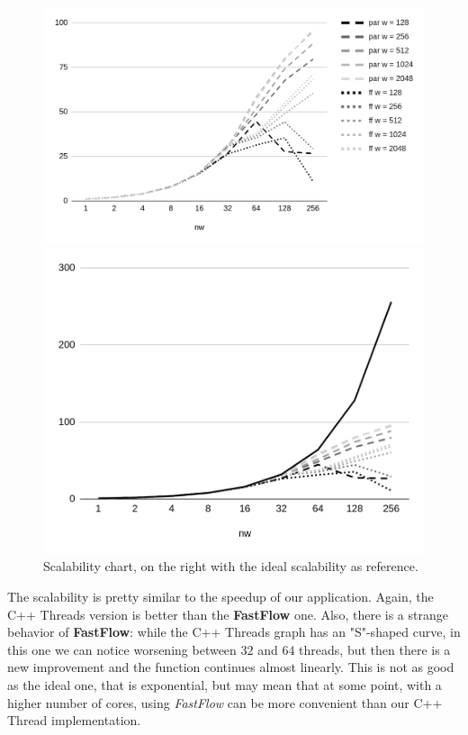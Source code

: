 \begin{figure}[H]
    \centering
    \begin{minipage}{.68\linewidth}
        \includegraphics[width=\linewidth]{assets/scalability}
    \end{minipage}
    \begin{minipage}{.3\linewidth}
        \includegraphics[width=\linewidth]{assets/scalability_ideal}
    \end{minipage}
    \caption{Scalability chart, on the right with the ideal scalability as reference.}
    \label{fig:scalability}
\end{figure}

\noindent
The scalability is pretty similar to the speedup of our application. Again, the C++ Threads version is better than the \textbf{FastFlow} one. Also, there is a strange behavior of \textbf{FastFlow}: while the C++ Threads graph has an "S"-shaped curve, in this one we can notice worsening between $32$ and $64$ threads, but then there is a new improvement and the function continues almost linearly. This is not as good as the ideal one, that is exponential, but may mean that at some point, with a higher number of cores, using \textit{FastFlow} can be more convenient than our C++ Thread implementation.



